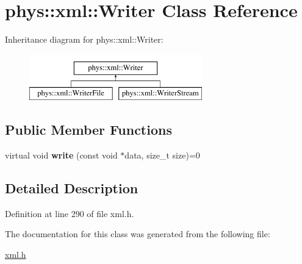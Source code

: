 \hypertarget{classphys_1_1xml_1_1Writer}{
\section{phys::xml::Writer Class Reference}
\label{d2/d28/classphys_1_1xml_1_1Writer}
}
Inheritance diagram for phys::xml::Writer:\begin{figure}[H]
\begin{center}
\leavevmode
\includegraphics[height=2.000000cm]{d2/d28/classphys_1_1xml_1_1Writer}
\end{center}
\end{figure}
\subsection*{Public Member Functions}
\begin{DoxyCompactItemize}
\item 
\hypertarget{classphys_1_1xml_1_1Writer_a7c3e01139166146bb655f32986580e49}{
virtual void {\bfseries write} (const void $\ast$data, size\_\-t size)=0}
\label{d2/d28/classphys_1_1xml_1_1Writer_a7c3e01139166146bb655f32986580e49}

\end{DoxyCompactItemize}


\subsection{Detailed Description}


Definition at line 290 of file xml.h.



The documentation for this class was generated from the following file:\begin{DoxyCompactItemize}
\item 
\hyperlink{xml_8h}{xml.h}\end{DoxyCompactItemize}
